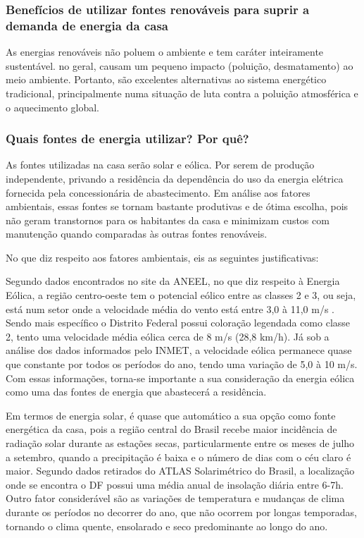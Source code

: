 \subsubsection{Benefícios de utilizar fontes renováveis para suprir a demanda de energia da casa}

	As energias renováveis não poluem o ambiente e tem caráter inteiramente sustentável. no geral, causam um pequeno impacto (poluição, desmatamento) ao meio ambiente. Portanto, são excelentes alternativas ao sistema energético tradicional, principalmente numa situação de luta contra a poluição atmosférica e o aquecimento global.

\subsubsection{Quais fontes de energia utilizar? Por quê?}

	As fontes utilizadas na casa serão solar e eólica. Por serem de produção independente, privando a residência da dependência do uso da energia elétrica fornecida pela concessionária de abastecimento. Em análise aos fatores ambientais, essas fontes se tornam bastante produtivas e de ótima escolha, pois não geram transtornos para os habitantes da casa e minimizam custos com manutenção quando comparadas às outras fontes renováveis.\cite{brasilescolafontesrenovaveis}

	No que diz respeito aos fatores ambientais, eis as seguintes justificativas:

	Segundo dados encontrados no site da \gls{ANEEL}, no que diz respeito à Energia Eólica, a região centro-oeste tem o potencial eólico entre as classes 2 e 3, ou seja, está num setor onde a velocidade média do vento está entre 3,0 à 11,0 m/s \cite{americadosolperguntasfrequentes}. Sendo mais específico o Distrito Federal possui coloração legendada como classe 2, tento uma velocidade média eólica cerca de 8 m/s (28,8 km/h). Já sob a análise dos dados informados pelo \gls{INMET}, a velocidade eólica permanece quase que constante por todos os períodos do ano, tendo uma variação de 5,0 à 10 m/s. Com essas informações, torna-se importante a sua consideração da energia eólica como uma das fontes de energia que abastecerá a residência.\cite{atlaseolico}


	Em termos de energia solar, é quase que automático a sua opção como fonte energética da casa, pois a região central do Brasil recebe maior incidência de radiação solar durante as estações secas, particularmente entre os meses de julho a setembro, quando a precipitação é baixa e o número de dias com o céu claro é maior\cite{portalsolar}. Segundo dados retirados do ATLAS Solarimétrico do Brasil\cite{ufpe2000}, a localização onde se encontra o DF possui uma média anual de insolação diária entre 6-7h. Outro fator considerável são as variações de temperatura e mudanças de clima durante os períodos no decorrer do ano, que não ocorrem por longas temporadas, tornando o clima quente, ensolarado e seco predominante ao longo do ano.
	
